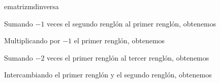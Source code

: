 \begin{examplebox}{}{ematrizmdinversa}
\begin{matrizn}
    \end{matrizn}
    Sumando $-1$ veces el segundo renglón al primer renglón, obtenemos
    \begin{matrizn}
    \end{matrizn}
    Multiplicando por $-1$ el primer renglón, obtenemos
    \begin{matrizn}
    \end{matrizn}
    Sumando $-2$ veces el primer renglón al tercer renglón, obtenemos
    \begin{matrizn}
    \end{matrizn}
    Intercambiando el primer renglón y el segundo renglón, obtenemos

\end{examplebox}
